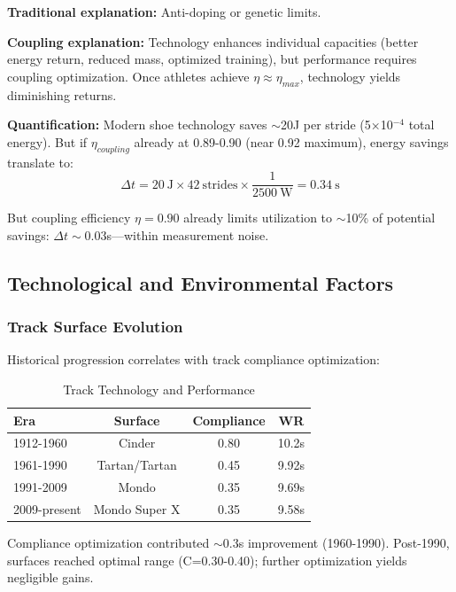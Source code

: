\documentclass[10pt]{article}
\begin{document}
\textbf{Traditional explanation:} Anti-doping or genetic limits.

\textbf{Coupling explanation:} Technology enhances individual capacities (better energy return, reduced mass, optimized training), but performance requires coupling optimization. Once athletes achieve $\eta \approx \eta_{max}$, technology yields diminishing returns.

\textbf{Quantification:} Modern shoe technology saves $\sim$20J per stride (5×10$^{-4}$ total energy). But if $\eta_{coupling}$ already at 0.89-0.90 (near 0.92 maximum), energy savings translate to:
\begin{equation}
\Delta t = 20~\text{J} \times 42~\text{strides} \times \frac{1}{2500~\text{W}} = 0.34~\text{s}
\end{equation}

But coupling efficiency $\eta=0.90$ already limits utilization to $\sim$10\% of potential savings: $\Delta t \sim 0.03$s—within measurement noise.

\subsection{Technological and Environmental Factors}

\subsubsection{Track Surface Evolution}

Historical progression correlates with track compliance optimization:

\begin{table}[H]
\centering
\caption{Track Technology and Performance}
\begin{tabular}{lccc}
\toprule
Era & Surface & Compliance & WR \\
\midrule
1912-1960 & Cinder & 0.80 & 10.2s \\
1961-1990 & Tartan/Tartan & 0.45 & 9.92s \\
1991-2009 & Mondo & 0.35 & 9.69s \\
2009-present & Mondo Super X & 0.35 & 9.58s \\
\bottomrule
\end{tabular}
\end{table}

Compliance optimization contributed $\sim$0.3s improvement (1960-1990). Post-1990, surfaces reached optimal range (C=0.30-0.40); further optimization yields negligible gains.
\end{document}
